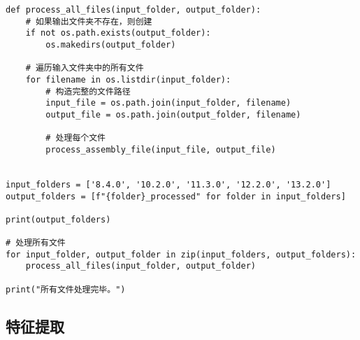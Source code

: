 \begin{lstlisting}
def process_all_files(input_folder, output_folder):
    # 如果输出文件夹不存在，则创建
    if not os.path.exists(output_folder):
        os.makedirs(output_folder)

    # 遍历输入文件夹中的所有文件
    for filename in os.listdir(input_folder):
        # 构造完整的文件路径
        input_file = os.path.join(input_folder, filename)
        output_file = os.path.join(output_folder, filename)

        # 处理每个文件
        process_assembly_file(input_file, output_file)


input_folders = ['8.4.0', '10.2.0', '11.3.0', '12.2.0', '13.2.0']
output_folders = [f"{folder}_processed" for folder in input_folders]

print(output_folders)

# 处理所有文件
for input_folder, output_folder in zip(input_folders, output_folders):
    process_all_files(input_folder, output_folder)

print("所有文件处理完毕。")

\end{lstlisting}
\vspace*{1cm}
\subsection*{特征提取}

